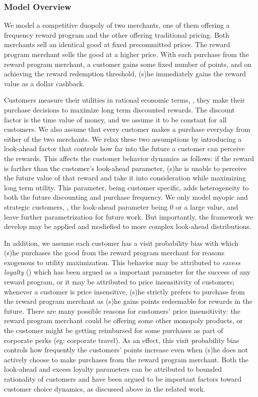 \subsubsection{Model Overview}
We model a competitive duopoly of two merchants, one of them offering a frequency reward program and the other offering traditional pricing.
Both merchants sell an identical good at fixed precommitted prices.
The reward program merchant sells the good at a higher price.
With each purchase from the reward program merchant, a customer gains some fixed number of points, and on achieving the reward redemption threshold, (s)he immediately gains the reward value as a dollar cashback.

Customers measure their utilities in rational economic terms, \ie, they make their purchase decisions to maximize long term discounted rewards.
The discount factor is the time value of money, and we assume it to be constant for all customers.
We also assume that every customer makes a purchase everyday from either of the two merchants.
We relax these two assumptions by introducing a look-ahead factor that controls how far into the future a customer can perceive the rewards. 
This affects the customer behavior dynamics as follows: if the reward is farther than the customer's look-ahead parameter, (s)he is unable to perceive the future value of that reward and take it into consideration while maximizing long term utility.
This parameter, being customer specific, adds heterogeneity to both the future discounting and purchase frequency.
We only model myopic and strategic customers, \ie, the look-ahead parameter being $0$ or a large value, and leave further parametrization for future work. But importantly, the framework we develop may be applied and modiefied to more complex look-ahead distributions.

In addition, we assume each customer has a visit probability bias with which (s)he purchases the good from the reward program merchant for reasons exogenous to utility maximization.
This behavior may be attributed to \emph{excess loyalty} (\cite{fader1993excess, sharp1997loyalty}) which has been argued as a important parameter for the success of any reward program, or it may be attributed to price insensitivity of customers; whenever a customer is price insensitive, (s)he strictly prefers to purchase from the reward program merchant as (s)he gains points redeemable for rewards in the future.
There are many possible reasons for customers' price insensitivity: the reward program merchant could be offering some other monopoly products, or the customer might be getting reimbursed for some purchases as part of corporate perks (eg: corporate travel).
As an effect, this visit probability bias controls how frequently the customers' points increase even when (s)he does not actively choose to make purchases from the reward program merchant.
Both the look-ahead and excess loyalty parameters can be attributed to bounded rationality of customers and have been argued to be important factors toward customer choice dynamics, as discussed above in the related work.



